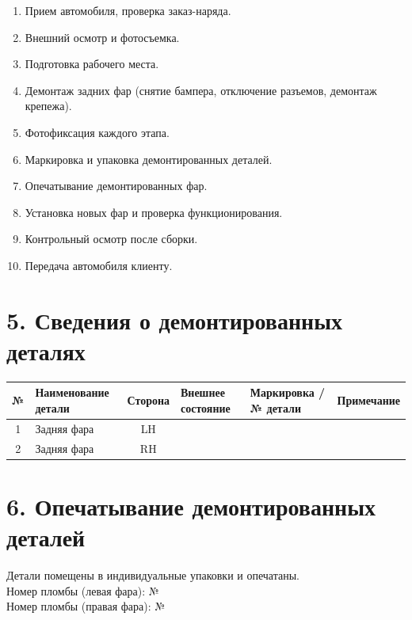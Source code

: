 \begin{enumerate}[leftmargin=1.5em]
	\item Прием автомобиля, проверка заказ-наряда.  
	\item Внешний осмотр и фотосъемка.  
	\item Подготовка рабочего места.  
	\item Демонтаж задних фар (снятие бампера, отключение разъемов, демонтаж крепежа).  
	\item Фотофиксация каждого этапа.  
	\item Маркировка и упаковка демонтированных деталей.  
	\item Опечатывание демонтированных фар.  
	\item Установка новых фар и проверка функционирования.  
	\item Контрольный осмотр после сборки.  
	\item Передача автомобиля клиенту.
\end{enumerate}


\vspace{1em}

\section*{5. Сведения о демонтированных деталях}

\renewcommand{\arraystretch}{1.3}
\begin{tabularx}{\textwidth}{|c|X|c|X|X|X|}
	\hline
	№ & Наименование детали & Сторона & Внешнее состояние & Маркировка / № детали & Примечание \\
	\hline
	1 & Задняя фара & LH & & & \\
	\hline
	2 & Задняя фара & RH & & & \\
	\hline
\end{tabularx}


\vspace{1em}

\section*{6. Опечатывание демонтированных деталей}

Детали помещены в индивидуальные упаковки и опечатаны.\\[0.5em]
Номер пломбы (левая фара): №\underline{\hspace{2cm}} \\
Номер пломбы (правая фара): №\underline{\hspace{2cm}} \\[0.5em]

